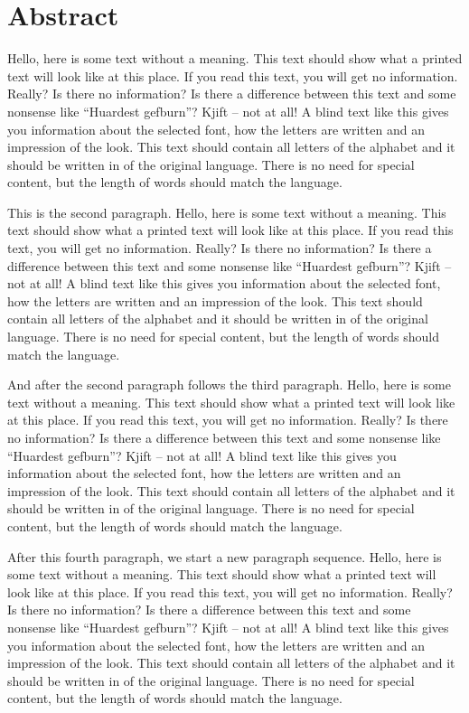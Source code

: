 \documentclass[class=scrbook, crop=false]{standalone}
\begin{document}
\chapter*{Abstract}
\label{Chapter::Abstract}
{
    \setlength{\parindent}{2em}
    \setlength{\parskip}{0em}

    Hello, here is some text without a meaning. This text should show what a printed text will look like at this place. If you read this text, you will get no information. Really? Is there no information? Is there a difference between this text and some nonsense like “Huardest gefburn”? Kjift – not at all! A blind text like this gives you information about the selected font, how the letters are written and an impression of the look. This text should contain all letters of the alphabet and it should be written in of the original language. There is no need for special content, but the length of words should match the language.
    
    This is the second paragraph. Hello, here is some text without a meaning. This text should show what a printed text will look like at this place. If you read this text, you will get no information. Really? Is there no information? Is there a difference between this text and some nonsense like “Huardest gefburn”? Kjift – not at all! A blind text like this gives you information about the selected font, how the letters are written and an impression of the look. This text should contain all letters of the alphabet and it should be written in of the original language. There is no need for special content, but the length of words should match the language.
    
    And after the second paragraph follows the third paragraph. Hello, here is some text without a meaning. This text should show what a printed text will look like at this place. If you read this text, you will get no information. Really? Is there no information? Is there a difference between this text and some nonsense like “Huardest gefburn”? Kjift – not at all! A blind text like this gives you information about the selected font, how the letters are written and an impression of the look. This text should contain all letters of the alphabet and it should be written in of the original language. There is no need for special content, but the length of
    words should match the language.
    
    After this fourth paragraph, we start a new paragraph sequence. Hello, here is some text without a meaning. This text should show what a printed text will look like at this place. If you read this text, you will get no information. Really? Is there no information? Is there a difference between this text and some nonsense like “Huardest gefburn”? Kjift – not at all! A blind text like this gives you information about the selected font, how the letters are written and an impression of the look. This text should contain all letters of the alphabet and it should be written in of the original language. There is no need for special content, but the length of words should match the language.
}
\end{document}
